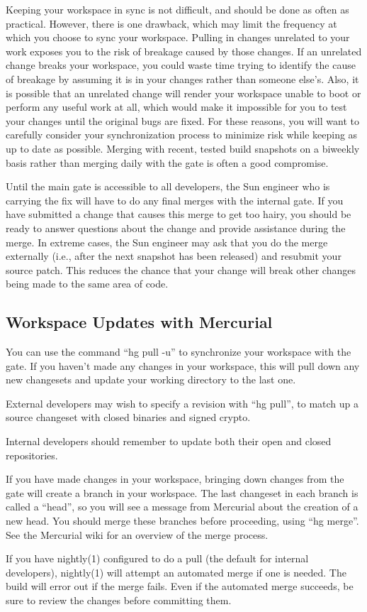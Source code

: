 \documentclass{article}
\begin{document}
Keeping your workspace in sync is not difficult, and should be done as often as
practical. However, there is one drawback, which may limit the frequency at
which you choose to sync your workspace. Pulling in changes unrelated to your
work exposes you to the risk of breakage caused by those changes. If an
unrelated change breaks your workspace, you could waste time trying to identify
the cause of breakage by assuming it is in your changes rather than someone
else's. Also, it is possible that an unrelated change will render your
workspace unable to boot or perform any useful work at all, which would make it
impossible for you to test your changes until the original bugs are fixed. For
these reasons, you will want to carefully consider your synchronization process
to minimize risk while keeping as up to date as possible. Merging with recent,
tested build snapshots on a biweekly basis rather than merging daily with the
gate is often a good compromise.

Until the main gate is accessible to all developers, the Sun engineer who is
carrying the fix will have to do any final merges with the internal gate. If
you have submitted a change that causes this merge to get too hairy, you should
be ready to answer questions about the change and provide assistance during the
merge. In extreme cases, the Sun engineer may ask that you do the merge
externally (i.e., after the next snapshot has been released) and resubmit your
source patch. This reduces the chance that your change will break other changes
being made to the same area of code.

\subsection*{Workspace Updates with Mercurial}

You can use the command ``hg pull -u'' to synchronize your workspace with the
gate. If you haven't made any changes in your workspace, this will pull down
any new changesets and update your working directory to the last one.

External developers may wish to specify a revision with ``hg pull'', to match
up a source changeset with closed binaries and signed crypto.

Internal developers should remember to update both their open and closed
repositories.

If you have made changes in your workspace, bringing down changes from the gate
will create a branch in your workspace. The last changeset in each branch is
called a ``head'', so you will see a message from Mercurial about the creation
of a new head. You should merge these branches before proceeding, using ``hg
merge''. See the Mercurial wiki for an overview of the merge process.

If you have nightly(1) configured to do a pull (the default for internal
developers), nightly(1) will attempt an automated merge if one is needed. The
build will error out if the merge fails. Even if the automated merge succeeds,
be sure to review the changes before committing them.
\end{document}

